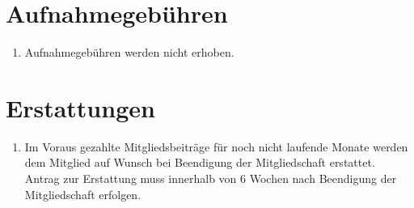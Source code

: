 \documentclass[a4paper,11pt]{scrartcl}
\begin{document}
\section{Aufnahmegebühren}
\begin{enumerate}
  \item Aufnahmegebühren werden nicht erhoben.
\end{enumerate}

\section{Erstattungen}
\begin{enumerate}
  \item Im Voraus gezahlte Mitgliedsbeiträge für noch nicht laufende Monate werden dem Mitglied auf Wunsch bei Beendigung der Mitgliedschaft erstattet. Antrag zur Erstattung muss innerhalb von 6 Wochen nach Beendigung der Mitgliedschaft erfolgen.
\end{enumerate}
\end{document}
